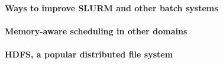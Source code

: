 \documentclass[conference,10pt]{IEEEtran}
\begin{document}
\paragraph{Ways to improve SLURM and other batch systems}

\paragraph{Memory-aware scheduling in other domains}

\paragraph{HDFS, a popular distributed file system}





 
\end{document}
